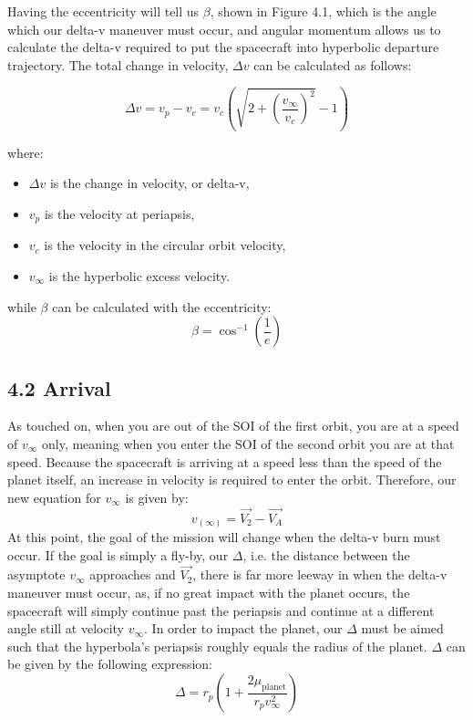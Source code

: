 \documentclass{article}
\numberwithin{figure}{section}
\begin{document}
Having the eccentricity will tell us \(\beta\), shown in Figure 4.1, which is the angle which our delta-v maneuver must occur, and angular momentum allows us to calculate the delta-v required to put the spacecraft into hyperbolic departure trajectory. The total change in velocity, \(\Delta v\) can be calculated as follows:

\[
\Delta v = v_p - v_c = v_c \left( \sqrt{2 + \left( \frac{v_\infty}{v_c} \right)^2} - 1 \right)
\]

where:
\begin{itemize}
    \item \(\Delta v\) is the change in velocity, or delta-v,
    \item \(v_p\) is the velocity at periapsis,
    \item \(v_c\) is the velocity in the circular orbit velocity,
    \item \(v_\infty\) is the hyperbolic excess velocity.
\end{itemize}

while \(\beta\) can be calculated with the eccentricity:
\[
\beta = \cos^{-1}\left( \frac{1}{e} \right)
\]
\subsection*{4.2 Arrival}
As touched on, when you are out of the SOI of the first orbit, you are at a speed of \(v_\infty\) only, meaning when you enter the SOI of the second orbit you are at that speed. Because the spacecraft is arriving at a speed less than the speed of the planet itself, an increase in velocity is required to enter the orbit. Therefore, our new equation for \(v_\infty\) is given by:
\[
v_(\infty)=\vec{V_2}-\vec{V_A}
\]
At this point, the goal of the mission will change when the delta-v burn must occur. If the goal is simply a fly-by, our \(\Delta\), i.e. the distance between the asymptote \(v_\infty\) approaches and \(\vec{V_2}\), there is far more leeway in when the delta-v maneuver must occur, as, if no great impact with the planet occurs, the spacecraft will simply continue past the periapsis and continue at a different angle still at velocity \(v_\infty\). In order to impact the planet, our \(\Delta\) must be aimed such that the hyperbola's periapsis roughly equals the radius of the planet. \(\Delta\) can be given by the following expression:
\[
\Delta = r_p \left( 1 + \frac{2\mu_\text{planet}}{r_p v_\infty^2} \right)
\]
\end{document}
